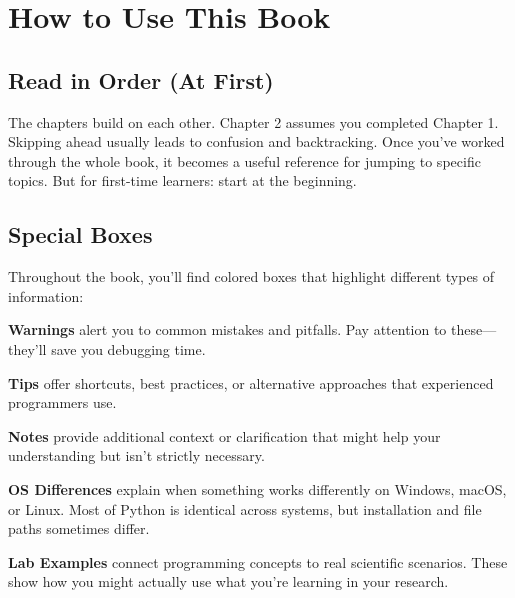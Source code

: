 
\chapter*{How to Use This Book}

\section*{Read in Order (At First)}

The chapters build on each other. Chapter 2 assumes you completed Chapter 1. Skipping ahead usually leads to confusion and backtracking. Once you've worked through the whole book, it becomes a useful reference for jumping to specific topics. But for first-time learners: start at the beginning.

\section*{Special Boxes}

Throughout the book, you'll find colored boxes that highlight different types of information:

\begin{warning}
\textbf{Warnings} alert you to common mistakes and pitfalls. Pay attention to these---they'll save you debugging time.
\end{warning}

\begin{tip}
\textbf{Tips} offer shortcuts, best practices, or alternative approaches that experienced programmers use.
\end{tip}

\begin{note}
\textbf{Notes} provide additional context or clarification that might help your understanding but isn't strictly necessary.
\end{note}

\begin{osbox}
\textbf{OS Differences} explain when something works differently on Windows, macOS, or Linux. Most of Python is identical across systems, but installation and file paths sometimes differ.
\end{osbox}

\begin{labexample}
\textbf{Lab Examples} connect programming concepts to real scientific scenarios. These show how you might actually use what you're learning in your research.
\end{labexample}


